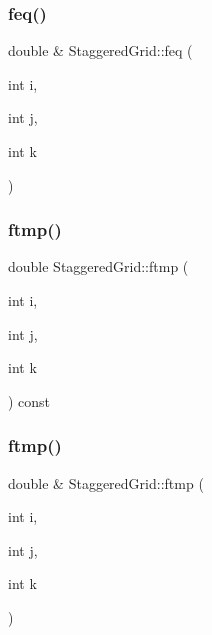\mbox{\label{classStaggeredGrid_ac0e3f62488a6dff7ce73d75f589c71cd}} 
\subsubsection{\texorpdfstring{feq()}{feq()}\hspace{0.1cm}{\footnotesize\ttfamily [2/2]}}
{\footnotesize\ttfamily double \& Staggered\+Grid\+::feq (\begin{DoxyParamCaption}\item[{int}]{i,  }\item[{int}]{j,  }\item[{int}]{k }\end{DoxyParamCaption})}

\mbox{\label{classStaggeredGrid_a04771274659141abf54e2ea1946a5a34}} 
\subsubsection{\texorpdfstring{ftmp()}{ftmp()}\hspace{0.1cm}{\footnotesize\ttfamily [1/2]}}
{\footnotesize\ttfamily double Staggered\+Grid\+::ftmp (\begin{DoxyParamCaption}\item[{int}]{i,  }\item[{int}]{j,  }\item[{int}]{k }\end{DoxyParamCaption}) const}

\mbox{\label{classStaggeredGrid_af34086dde8f882682b1be25bbf785b26}} 
\subsubsection{\texorpdfstring{ftmp()}{ftmp()}\hspace{0.1cm}{\footnotesize\ttfamily [2/2]}}
{\footnotesize\ttfamily double \& Staggered\+Grid\+::ftmp (\begin{DoxyParamCaption}\item[{int}]{i,  }\item[{int}]{j,  }\item[{int}]{k }\end{DoxyParamCaption})}

